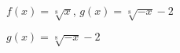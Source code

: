 {$f(x) = \sqrt[8]{x}$, $g(x) = \sqrt[8]{-x} - 2$} 
{$g(x) = \sqrt[8]{-x} - 2$\\
\begin{center}
\end{center}}